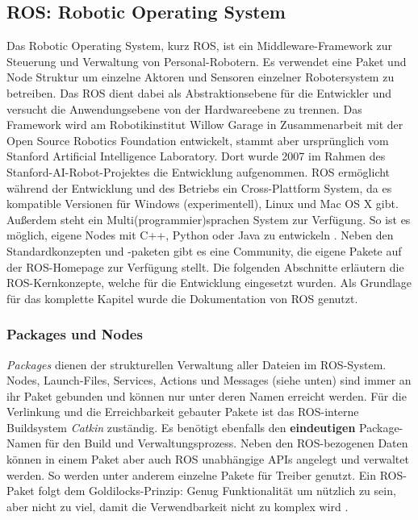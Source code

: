 \subsection{ROS: Robotic Operating System}
\label{sec:basic-ros}
    
Das Robotic Operating System, kurz ROS, ist ein Middleware-Framework zur Steuerung und Verwaltung von Personal-Robotern. Es verwendet eine Paket und Node Struktur um einzelne Aktoren und Sensoren einzelner Robotersystem zu betreiben. Das ROS dient dabei als Abstraktionsebene für die Entwickler und versucht die Anwendungsebene von der Hardwareebene zu trennen. Das Framework wird am Robotikinstitut Willow Garage in Zusammenarbeit mit der Open Source Robotics Foundation entwickelt, stammt aber ursprünglich vom Stanford Artificial Intelligence Laboratory. Dort wurde 2007 im Rahmen des Stanford-AI-Robot-Projektes die Entwicklung aufgenommen. ROS ermöglicht während der Entwicklung und des Betriebs ein Cross-Plattform System, da es kompatible Versionen für Windows (experimentell), Linux und Mac OS X gibt. Außerdem steht ein Multi(programmier)sprachen System zur Verfügung. So ist es möglich, eigene Nodes mit C++, Python oder Java zu entwickeln \citep{quigley2009ros}. Neben den Standardkonzepten und -paketen gibt es eine Community, die eigene Pakete auf der ROS-Homepage zur Verfügung stellt. Die folgenden Abschnitte erläutern die ROS-Kernkonzepte, welche für die Entwicklung eingesetzt wurden. Als Grundlage für das komplette Kapitel wurde die Dokumentation von ROS genutzt.

\subsubsection{Packages und Nodes}

\textit{Packages} dienen der strukturellen Verwaltung aller Dateien im ROS-System. Nodes, Launch-Files, Services, Actions und Messages (siehe unten) sind immer an ihr Paket gebunden und können nur unter deren Namen erreicht werden. Für die Verlinkung und die Erreichbarkeit gebauter Pakete ist das ROS-interne Buildsystem \textit{Catkin} zuständig. Es benötigt ebenfalls den \textbf{eindeutigen} Package-Namen für den Build und Verwaltungsprozess. Neben den ROS-bezogenen Daten können in einem Paket aber auch ROS unabhängige APIs angelegt und verwaltet werden. So werden unter anderem einzelne Pakete für Treiber genutzt. Ein ROS-Paket folgt dem Goldilocks-Prinzip: Genug Funktionalität um nützlich zu sein, aber nicht zu viel, damit die Verwendbarkeit nicht zu komplex wird \citep{roswiki}.

